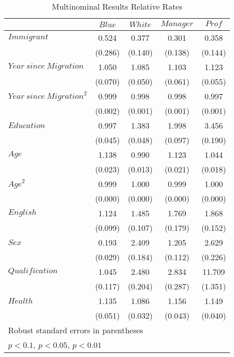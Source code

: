 \scriptsize\centering{}
\begin{longtable}{l*4c}
  \caption{Multinominal Results Relative Rates \label{lab:mlogit_rr}} \\
  \toprule & $\mathit{Blue}$ & $\mathit{White}$ &
  $\mathit{Manager}$ & $\mathit{Prof}$ \\\hline
  $\mathit{Immigrant}$
  & 0.524 & 0.377\sym{***}& 0.301\sym{***}& 0.358\sym{**} \\
& (0.286) & (0.140) & (0.138) & (0.144) \\
  $\mathit{Year\ since\ Migration}$
  & 1.050 & 1.085\sym{*}  & 1.103\sym{*}  & 1.123\sym{**} \\
& (0.070) & (0.050) & (0.061) & (0.055) \\
  $\mathit{Year\ since\ Migration}^2$
  & 0.999 & 0.998 & 0.998\sym{*}  & 0.997\sym{**} \\
& (0.002) & (0.001) & (0.001) & (0.001) \\
  $\mathit{Education}$
  & 0.997 & 1.383\sym{***}& 1.998\sym{***}& 3.456\sym{***}\\
& (0.045) & (0.048) & (0.097) & (0.190) \\
  $\mathit{Age}$
  & 1.138\sym{***}& 0.990 & 1.123\sym{***}& 1.044\sym{**} \\
& (0.023) & (0.013) & (0.021) & (0.018) \\
  $\mathit{Age}^2$
  & 0.999\sym{***}& 1.000 & 0.999\sym{***}& 1.000 \\
& (0.000) & (0.000) & (0.000) & (0.000) \\
  $\mathit{English}$
  & 1.124 & 1.485\sym{***}& 1.769\sym{***}& 1.868\sym{***}\\
& (0.099) & (0.107) & (0.179) & (0.152) \\
  $\mathit{Sex}$
  & 0.193\sym{***}& 2.409\sym{***}& 1.205\sym{**} & 2.629\sym{***}\\
& (0.029) & (0.184) & (0.112) & (0.226) \\
  $\mathit{Qualification}$
  & 1.045 & 2.480\sym{***}& 2.834\sym{***}& 11.709\sym{***}\\
& (0.117) & (0.204) & (0.287) & (1.351) \\
  $\mathit{Health}$
  & 1.135\sym{***}& 1.086\sym{***}& 1.156\sym{***}& 1.149\sym{***}\\
& (0.051) & (0.032) & (0.043) & (0.040) \\
  \bottomrule
  \multicolumn{5}{l}{\tiny Robust standard errors in parentheses} \\
  \multicolumn{5}{l}{\tiny \sym{*} \(p<0.1\), \sym{**} \(p<0.05\), \sym{***} \(p<0.01\)} \\
\end{longtable}